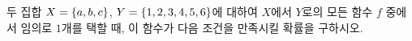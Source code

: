 두 집합 $X=\{a{,}\mkern3mu\mathopen{}b{,}\mkern3mu\mathopen{}c\}$, $Y=\{1{,}\mkern3mu\mathopen{}2{,}\mkern3mu\mathopen{}3{,}\mkern3mu\mathopen{}4{,}\mkern3mu\mathopen{}5{,}\mkern3mu\mathopen{}6\}$에 대하여 $X$에서 $Y$로의 모든 함수 $f$ 중에서 임의로 $1$개를 택할 때, 이 함수가 다음 조건을 만족시킬 확률을 구하시오. 

